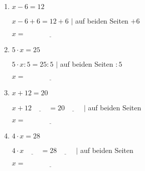 \begin{enumerate}[label=\arabic*.]
\begin{enumerate}[label=\alph*)]
        \vspace{0.5cm}

        \item $x - 6 = 12$

        $x - 6 + 6 = 12 + 6$ \hspace{2cm} $|$ auf beiden Seiten $+6$

        $x = \underline{\hspace{3cm}}$

        \vspace{0.5cm}

        \item $5 \cdot x = 25$

        $5 \cdot x : 5 = 25 : 5$ \hspace{2cm} $|$ auf beiden Seiten $:5$

        $x = \underline{\hspace{3cm}}$

        \vspace{0.5cm}

        \item $x + 12 = 20$

        $x + 12 \underline{\hspace{1cm}} = 20 \underline{\hspace{1cm}}$ \hspace{1cm} $|$ auf beiden Seiten \underline{\hspace{2cm}}

        $x = \underline{\hspace{3cm}}$

        \vspace{0.5cm}

        \item $4 \cdot x = 28$

        $4 \cdot x \underline{\hspace{1cm}} = 28 \underline{\hspace{1cm}}$ \hspace{1cm} $|$ auf beiden Seiten \underline{\hspace{2cm}}

        $x = \underline{\hspace{3cm}}$
    \end{enumerate}
\end{enumerate}